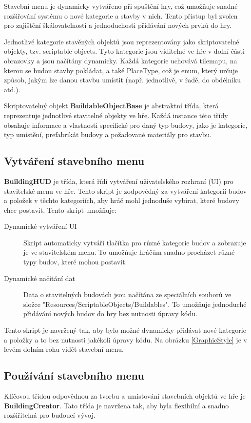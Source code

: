 Stavební menu je dynamicky vytvářeno při spuštění hry, což umožňuje snadné rozšiřování systému o nové kategorie a stavby v nich. Tento přístup byl zvolen pro zajištění škálovatelnosti a jednoduchosti přidávání nových prvků do hry.

Jednotlivé kategorie stavěných objektů jsou reprezentovány jako skriptovatelné objekty, tzv. scriptable objects. Tyto kategorie jsou viditelné ve hře v dolní části obrazovky a jsou načítány dynamicky. Každá kategorie uchovává tilemapu, na kterou se budou stavby pokládat, a také PlaceType, což je enum, který určuje způsob, jakým lze danou stavbu umístit (např. jednotlivě, v řadě, do obdélníku atd.).

Skriptovatelný objekt \textbf{BuildableObjectBase} je abstraktní třída, která reprezentuje jednotlivé stavitelné objekty ve hře. Každá instance této třídy obsahuje informace a vlastnosti specifické pro daný typ budovy, jako je kategorie, typ umístění, prefabrikát budovy a požadované materiály pro stavbu.

\subsection{Vytváření stavebního menu}
\textbf{BuildingHUD} je třída, která řídí vytváření uživatelského rozhraní (UI) pro stavitelské menu ve hře. Tento skript je zodpovědný za vytváření kategorií budov a položek v těchto kategoriích, aby hráč mohl jednoduše vybírat, které budovy chce postavit. Tento skript umožňuje:

\begin{description}
	\item[Dynamické vytváření UI] Skript automaticky vytváří tlačítka pro různé kategorie budov a zobrazuje je ve stavitelském menu. To umožňuje hráčům snadno procházet různé typy budov, které mohou postavit.
	\item[Dynamické načítání dat] Data o stavitelných budovách jsou načítána ze speciálních souborů ve složce "Resources/ScriptableObjects/Buildables". To umožňuje jednoduché přidávání nových budov do hry bez nutnosti úpravy kódu.
\end{description}

Tento skript je navržený tak, aby bylo možné dynamicky přidávat nové kategorie a položky a to bez nutnosti jakékoli úpravy kódu. Na obrázku \ref{GraphicStyle} je v levém dolním rohu vidět stavební menu.

\subsection{Používání stavebního menu}
Klíčovou třídou odpovědnou za tvorbu a umisťování stavebních objektů ve hře je \textbf{BuildingCreator}. Tato třída je navržena tak, aby byla flexibilní a snadno rozšiřitelná pro budoucí vývoj.


